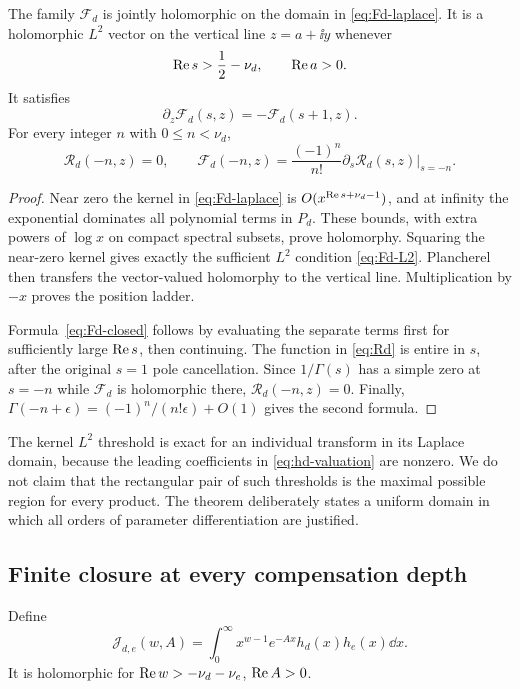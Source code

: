 \begin{proposition}
\label{thm:Fd-domain}
The family $\mathcal F_d$ is jointly holomorphic on the domain in
\eqref{eq:Fd-laplace}. It is a holomorphic $L^2$ vector on the vertical
line $z=a+\ii y$ whenever
\begin{equation}\label{eq:Fd-L2}
 \operatorname{Re} s>\frac12-\nu_d,\qquad\operatorname{Re} a>0.
\end{equation}
It satisfies
\begin{equation}\label{eq:Fd-ladder}
 \partial_z\mathcal F_d(s,z)=-\mathcal F_d(s+1,z).
\end{equation}
For every integer $n$ with $0\le n<\nu_d$,
\begin{equation}\label{eq:Rd-zero}
 \mathcal R_d(-n,z)=0,\qquad
 \mathcal F_d(-n,z)=\frac{(-1)^n}{n!}
                    \left.\partial_s\mathcal R_d(s,z)\right|_{s=-n}.
\end{equation}
\end{proposition}
\begin{proof}
Near zero the kernel in \eqref{eq:Fd-laplace} is
$O(x^{\operatorname{Re} s+\nu_d-1})$, and at infinity the exponential dominates
all polynomial terms in $P_d$. These bounds, with extra powers of
$\log x$ on compact spectral subsets, prove holomorphy. Squaring the
near-zero kernel gives exactly the sufficient $L^2$ condition
\eqref{eq:Fd-L2}. Plancherel then transfers the vector-valued holomorphy
to the vertical line. Multiplication by $-x$ proves the position ladder.

Formula~\eqref{eq:Fd-closed} follows by evaluating the separate terms
first for sufficiently large $\operatorname{Re} s$, then continuing.
The function in \eqref{eq:Rd} is entire in $s$, after the original
$s=1$ pole cancellation. Since $1/\Gamma(s)$ has a simple zero at
$s=-n$ while $\mathcal F_d$ is holomorphic there, $\mathcal R_d(-n,z)=0$.
Finally,
$\Gamma(-n+\epsilon)=(-1)^n/(n!\epsilon)+O(1)$ gives the second formula.
\end{proof}

The kernel $L^2$ threshold is exact for an individual transform in its
Laplace domain, because the leading coefficients in
\eqref{eq:hd-valuation} are nonzero. We do not claim that the rectangular
pair of such thresholds is the maximal possible region for every product.
The theorem deliberately states a uniform domain in which all orders of
parameter differentiation are justified.

\subsection{Finite closure at every compensation depth}
Define
\begin{equation}\label{eq:J-integral}
 \mathcal J_{d,e}(w,A)=\int_0^\infty
          x^{w-1}e^{-Ax}h_d(x)h_e(x)\dd x.
\end{equation}
It is holomorphic for
$\operatorname{Re} w>-\nu_d-\nu_e$, $\operatorname{Re} A>0$.

